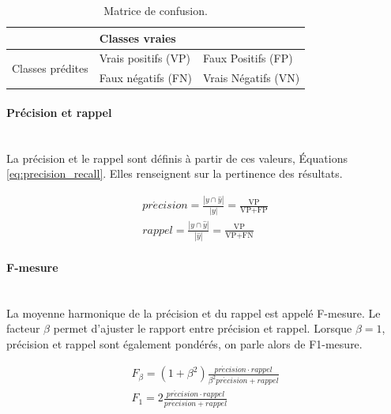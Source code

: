 \begin{table}[]
    \centering
    \begin{tabular}{l|l|l|}
        \cline{2-3}
        & \multicolumn{2}{l|}{Classes vraies}               \\ \hline
        \multicolumn{1}{|l|}{\multirow{2}{*}{Classes prédites}} & Vrais positifs (VP) & Faux Positifs (FP)  \\ \cline{2-3} 
        \multicolumn{1}{|l|}{}                            & Faux négatifs (FN)  & Vrais Négatifs (VN) \\ \hline
    \end{tabular}
    \caption{Matrice de confusion.}
    \label{tab:confusion_matrix}
\end{table}

\paragraph{Précision et rappel}\mbox{} \\
La précision et le rappel sont définis à partir de ces valeurs, Équations \ref{eq:precision_recall}.
Elles renseignent sur la pertinence des résultats.

\begin{equation} \label{eq:precision_recall}
\begin{split}
pr\acute{e}cision = \frac{|y \cap \hat{y}|}{|y|} = \frac{\text{VP}}{\text{VP}+\text{FP}}
\\
rappel = \frac{|y \cap \hat{y}|}{|\hat{y}|} = \frac{\text{VP}}{\text{VP}+\text{FN}}
\end{split}
\end{equation}

\paragraph{F-mesure}\mbox{} \\
La moyenne harmonique de la précision et du rappel est appelé F-mesure.
Le facteur $\beta$ permet d'ajuster le rapport entre précision et rappel.
Lorsque $\beta = 1$, précision et rappel sont également pondérés, on parle alors de F1-mesure.

\begin{equation} \label{eq:f1_score}
\begin{split}
F_{\beta}=\left(1+\beta^{2}\right) \frac{pr\acute{e}cision \cdot rappel}{\beta^{2} pr\acute{e}cision + rappel}
\\
F_{1}= 2 \frac{pr\acute{e}cision \cdot rappel}{pr\acute{e}cision + rappel}
\end{split}
\end{equation}

